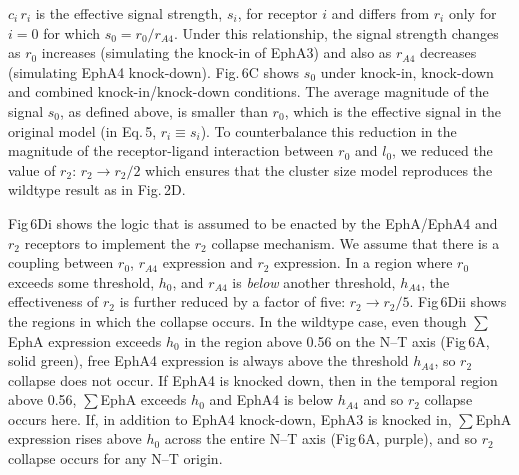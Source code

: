 \documentclass[9pt]{elife} %
\begin{document}
$c_i\,r_{i}$ is the effective signal strength, $s_i$, for receptor $i$ and differs from $r_{i}$ only for $i=0$ for which $s_0 = r_0/r_{\!\scriptscriptstyle A4}$.
Under this relationship, the signal strength changes as $r_0$ increases (simulating the knock-in of EphA3) and also as $r_{\!\scriptscriptstyle A4}$ decreases (simulating EphA4 knock-down).
Fig.\,6C shows $s_0$ under knock-in, knock-down and combined knock-in/knock-down conditions.
The average magnitude of the signal $s_0$, as defined above, is smaller than $r_0$, which is the effective signal in the original model (in Eq.\,5, $r_{i} \equiv s_i$). To counterbalance this reduction in the magnitude of the receptor-ligand interaction between $r_0$ and $l_0$, we reduced the value of $r_2$: $r_2 \rightarrow r_2/2$ which ensures that the cluster size model reproduces the wildtype result as in Fig.\,2D.

Fig\,6Di shows the logic that is assumed to be enacted by the EphA/EphA4 and $r_2$ receptors to implement the $r_2$ collapse mechanism. We assume that there is a coupling between $r_0$, $r_{A4}$ expression and $r_2$ expression. In a region where $r_0$ exceeds some threshold, $h_0$, and $r_{A4}$ is \emph{below} another threshold, $h_{A4}$, the effectiveness of $r_2$ is further reduced by a factor of five: $r_2 \rightarrow r_2/5$.
Fig\,6Dii shows the regions in which the collapse occurs.
In the wildtype case, even though $\sum$EphA expression exceeds $h_0$ in the region above 0.56 on the N--T axis (Fig\,6A, solid green), free EphA4 expression is always above the threshold $h_{A4}$, so $r_2$ collapse does not occur.
If EphA4 is knocked down, then in the temporal region above 0.56, $\sum$EphA exceeds $h_0$ and EphA4 is below $h_{A4}$ and so $r_2$ collapse occurs here.
If, in addition to EphA4 knock-down, EphA3 is knocked in, $\sum$EphA expression rises above $h_0$ across the entire N--T axis (Fig\,6A, purple), and so $r_2$ collapse occurs for any N--T origin.


\end{document}
